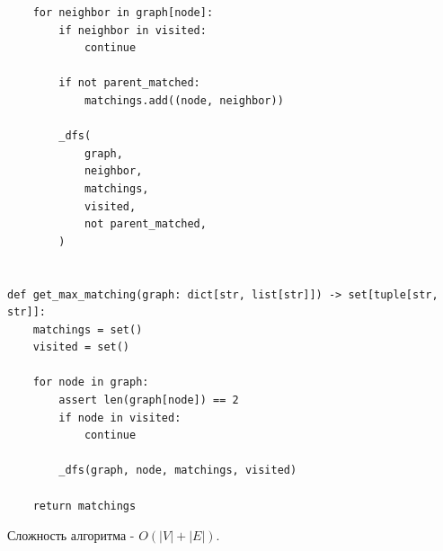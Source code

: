 \documentclass{article}
\begin{document}
\begin{enumerate}
\begin{lstlisting}
    for neighbor in graph[node]:
        if neighbor in visited:
            continue

        if not parent_matched:
            matchings.add((node, neighbor))

        _dfs(
            graph,
            neighbor,
            matchings,
            visited,
            not parent_matched,
        )


def get_max_matching(graph: dict[str, list[str]]) -> set[tuple[str, str]]:
    matchings = set()
    visited = set()

    for node in graph:
        assert len(graph[node]) == 2
        if node in visited:
            continue

        _dfs(graph, node, matchings, visited)

    return matchings
		  \end{lstlisting}

	      Сложность алгоритма - 
		  $O(\left| V \right| + \left| E \right|)$.
\end{enumerate}
\end{document}
